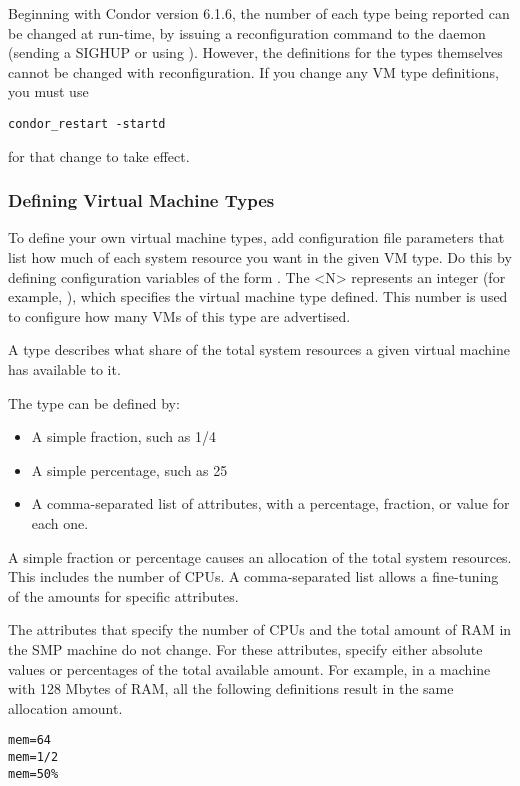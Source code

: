 Beginning with Condor version 6.1.6, the number of each type being
reported can be changed at run-time, by issuing a reconfiguration
command to
the  daemon (sending a SIGHUP or using ).
However, the definitions for the types themselves cannot be changed
with reconfiguration.
If you change any VM type definitions, you must use 
\begin{verbatim}
condor_restart -startd
\end{verbatim}
for that change to take effect.

\subsubsection{\label{sec:VM-Type-Define}
Defining Virtual Machine Types}

To define your own virtual machine types, add configuration file
parameters that list how much of each system resource you want in the
given VM type.  Do this by defining configuration
variables of the form
.
The <N> represents an integer (for example, 
), which specifies the virtual 
machine type defined.
This number is used to configure how many VMs of this type
are advertised.

A type describes what share of the total system resources a given
virtual machine has available to it.

The type can be defined by:
\begin{itemize}
  \item A simple fraction, such as 1/4
  \item A simple percentage, such as 25\Percent
  \item A comma-separated list of attributes, with a percentage,
	fraction, or value for each one.
\end{itemize}
A simple fraction or percentage causes an allocation
of the total system resources.
This includes the number of CPUs.
A comma-separated list allows a fine-tuning of
the amounts for specific attributes.

The attributes that specify the number of CPUs
and the total amount of RAM in
the SMP machine do not change.
For these attributes, specify either absolute values or
percentages of the total available amount.  
For example, in a machine with 128 Mbytes of RAM,
all the following definitions result in the same allocation amount.
\begin{verbatim}
mem=64
mem=1/2
mem=50%
\end{verbatim}


